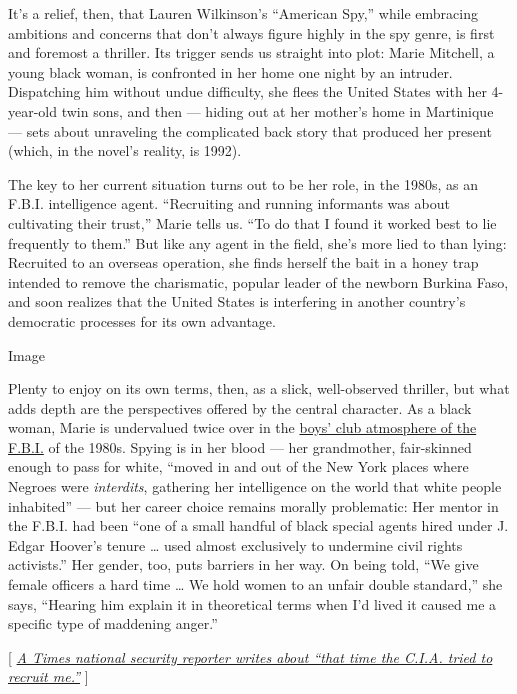 It's a relief, then, that Lauren Wilkinson's ``American Spy,'' while
embracing ambitions and concerns that don't always figure highly in the
spy genre, is first and foremost a thriller. Its trigger sends us
straight into plot: Marie Mitchell, a young black woman, is confronted
in her home one night by an intruder. Dispatching him without undue
difficulty, she flees the United States with her 4-year-old twin sons,
and then --- hiding out at her mother's home in Martinique --- sets
about unraveling the complicated back story that produced her present
(which, in the novel's reality, is 1992).

The key to her current situation turns out to be her role, in the 1980s,
as an F.B.I. intelligence agent. ``Recruiting and running informants was
about cultivating their trust,'' Marie tells us. ``To do that I found it
worked best to lie frequently to them.'' But like any agent in the
field, she's more lied to than lying: Recruited to an overseas
operation, she finds herself the bait in a honey trap intended to remove
the charismatic, popular leader of the newborn Burkina Faso, and soon
realizes that the United States is interfering in another country's
democratic processes for its own advantage.

Image

Plenty to enjoy on its own terms, then, as a slick, well-observed
thriller, but what adds depth are the perspectives offered by the
central character. As a black woman, Marie is undervalued twice over in
the
\href{https://www.nytimes3xbfgragh.onion/2018/11/23/us/politics/fbi-academy-women-discrimination.html}{boys'
club atmosphere of the F.B.I.} of the 1980s. Spying is in her blood ---
her grandmother, fair-skinned enough to pass for white, ``moved in and
out of the New York places where Negroes were \emph{interdits},
gathering her intelligence on the world that white people inhabited''
--- but her career choice remains morally problematic: Her mentor in the
F.B.I. had been ``one of a small handful of black special agents hired
under J. Edgar Hoover's tenure \ldots{} used almost exclusively to
undermine civil rights activists.'' Her gender, too, puts barriers in
her way. On being told, ``We give female officers a hard time \ldots{}
We hold women to an unfair double standard,'' she says, ``Hearing him
explain it in theoretical terms when I'd lived it caused me a specific
type of maddening anger.''

{[}
\emph{\href{https://www.nytimes3xbfgragh.onion/2018/02/14/insider/are-spies-like-us-a-national-security-reporter-says-yes-and-no.html}{A
Times national security reporter writes about ``that time the C.I.A.
tried to recruit me.''}} {]}

